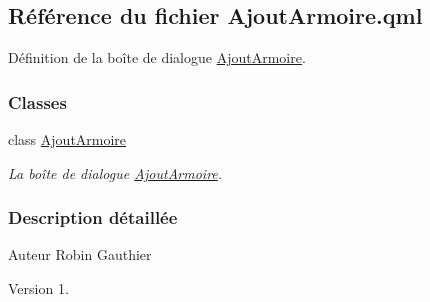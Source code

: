 \hypertarget{_ajout_armoire_8qml}{}\subsection{Référence du fichier Ajout\+Armoire.\+qml}
\label{_ajout_armoire_8qml}


Définition de la boîte de dialogue \hyperlink{class_ajout_armoire}{Ajout\+Armoire}.  


\subsubsection*{Classes}
\begin{DoxyCompactItemize}
\item 
class \hyperlink{class_ajout_armoire}{Ajout\+Armoire}
\begin{DoxyCompactList}\small\item\em La boîte de dialogue \hyperlink{class_ajout_armoire}{Ajout\+Armoire}. \end{DoxyCompactList}\end{DoxyCompactItemize}


\subsubsection{Description détaillée}
\begin{DoxyAuthor}{Auteur}
Robin Gauthier
\end{DoxyAuthor}
\begin{DoxyVersion}{Version}
1. 
\end{DoxyVersion}
